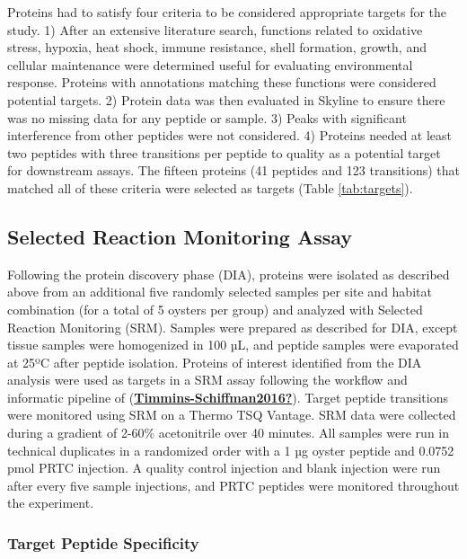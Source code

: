 \documentclass [11pt, proquest] {uwthesis}[2015/03/03]
\begin{document}
Proteins had to satisfy four criteria to be considered appropriate targets for the study. 1) After an extensive literature search, functions related to oxidative stress, hypoxia, heat shock, immune resistance, shell formation, growth, and cellular maintenance were determined useful for evaluating environmental response. Proteins with annotations matching these functions were considered potential targets. 2) Protein data was then evaluated in Skyline to ensure there was no missing data for any peptide or sample. 3) Peaks with significant interference from other peptides were not considered. 4) Proteins needed at least two peptides with three transitions per peptide to quality as a potential target for downstream assays. The fifteen proteins (41 peptides and 123 transitions) that matched all of these criteria were selected as targets (Table \ref{tab:targets}).

\hypertarget{selected-reaction-monitoring-assay}{%
\subsection{Selected Reaction Monitoring Assay}\label{selected-reaction-monitoring-assay}}

Following the protein discovery phase (DIA), proteins were isolated as described above from an additional five randomly selected samples per site and habitat combination (for a total of 5 oysters per group) and analyzed with Selected Reaction Monitoring (SRM). Samples were prepared as described for DIA, except tissue samples were homogenized in 100 µL, and peptide samples were evaporated at 25ºC after peptide isolation.
Proteins of interest identified from the DIA analysis were used as targets in a SRM assay following the workflow and informatic pipeline of (\protect\hyperlink{ref-Timmins-Schiffman2016}{\textbf{Timmins-Schiffman2016?}}). Target peptide transitions were monitored using SRM on a Thermo TSQ Vantage. SRM data were collected during a gradient of 2-60\% acetonitrile over 40 minutes. All samples were run in technical duplicates in a randomized order with a 1 µg oyster peptide and 0.0752 pmol PRTC injection. A quality control injection and blank injection were run after every five sample injections, and PRTC peptides were monitored throughout the experiment.

\hypertarget{target-peptide-specificity}{%
\subsubsection{Target Peptide Specificity}\label{target-peptide-specificity}}
\end{document}
